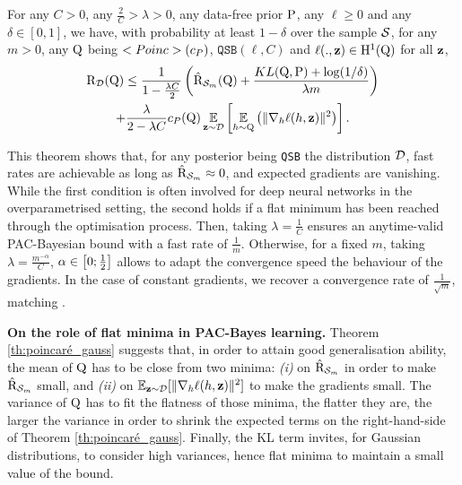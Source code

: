 \begin{theorem}\label{th:poincaré_gauss}
For any $C>0$, any $\frac{2}{C}>\lambda >0$, any data-free prior $\P$, any  $\ell\geq 0$ and any $\delta\in [0,1]$, we have, with probability at least $1-\delta$ over the sample $\S$, for any $m>0$, any $\Q$ being $\Poinc(c_P)$, $\texttt{QSB}(\ell,C)$ and $\ell(.,\z)\in \mathrm{H}^{1}(\Q)$ for all $\z$,
\begin{multline*}
\Risk_{\D}(\Q) \leq \frac{1}{1-\frac{\lambda C}{2}} \LP \hat{\Risk}_{\S_m}(\Q) + \frac{KL(\Q,\P) +\log(1/\delta)}{\lambda m} \RP \\
+ \frac{\lambda}{2-\lambda C} c_{P}(\Q)\EE_{\z\sim\D} \LB \EE_{h\sim \Q}\LP \|\nabla_h \ell(h,\z)\|^2 \RP \RB.
\end{multline*}
\end{theorem}
This theorem shows that, for any posterior being \texttt{QSB} \wrt the distribution $\D$, fast rates are achievable as long as $\hat{\Risk}_{\S_m}\approx 0$, and expected gradients are vanishing.
While the first condition is often involved for deep neural networks in the overparametrised setting, the second holds if a flat minimum has been reached through the optimisation process.
Then, taking $\lambda = \frac{1}{C}$ ensures an anytime-valid PAC-Bayesian bound with a fast rate of $\frac{1}{m}$.
Otherwise, for a fixed $m$, taking $\lambda= \frac{m^{-\alpha}}{C}$, $\alpha \in \LB0;\frac{1}{2}\RB$ allows to adapt the convergence speed \wrt the behaviour of the gradients. 
In the case of constant gradients, we recover a convergence rate of $\frac{1}{\sqrt{m}}$, matching \citet[Theorem 4.1]{alquier2016properties}. 

  
\noindent\textbf{On the role of flat minima in PAC-Bayes learning.} 
Theorem \ref{th:poincaré_gauss} suggests that, in order to attain good generalisation ability, the mean of $\Q$ has to be close from two minima: 
\emph{(i)} on $\hat{\Risk}_{\S_m}$ in order to make $\hat{\Risk}_{\S_m}$ small, and \emph{(ii)} on $\Ebb_{\z\sim\D}[\|\nabla_h \ell(h,\z)\|^2]$  to make the gradients small. The variance of $\Q$ has to fit the flatness of those minima, the flatter they are, the larger the variance in order to shrink the expected terms on the right-hand-side of Theorem \ref{th:poincaré_gauss}. Finally, the KL term invites, \eg for Gaussian distributions, to consider high variances, hence flat minima to maintain a small value of the bound.
  
